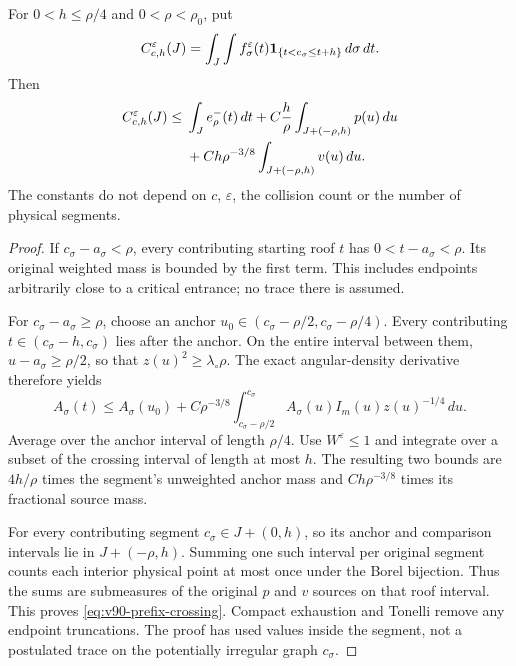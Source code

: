 \begin{lemma}
\label{lem:v90-prefix-crossing}
For $0<h\le\rho/4$ and $0<\rho<\rho_0$, put
\[
 C_{c,h}^\varepsilon(J)=\int_J\int
    f_\sigma^\varepsilon(t)\mathbf1_{\{t<c_\sigma\le t+h\}}\,d\sigma\,dt.
\]
Then
\begin{align}
 C_{c,h}^\varepsilon(J)\le{}&\int_J e_\rho^-(t)\,dt
       +C\frac h\rho\int_{J+(-\rho,h)}p(u)\,du\notag\\
       &+C h\rho^{-3/8}\int_{J+(-\rho,h)}v(u)\,du.
                                           \label{eq:v90-prefix-crossing}
\end{align}
The constants do not depend on $c$, $\varepsilon$, the collision
count or the number of physical segments.
\end{lemma}
\begin{proof}
If $c_\sigma-a_\sigma<\rho$, every contributing starting roof
$t$ has $0<t-a_\sigma<\rho$. Its original weighted mass is bounded
by the first term. This includes endpoints arbitrarily close to a
critical entrance; no trace there is assumed.

For $c_\sigma-a_\sigma\ge\rho$, choose an anchor
$u_0\in(c_\sigma-\rho/2,c_\sigma-\rho/4)$. Every contributing
$t\in(c_\sigma-h,c_\sigma)$ lies after the anchor. On the entire
interval between them, $u-a_\sigma\ge\rho/2$, so that
$z(u)^2\ge\lambda_\circ\rho$. The exact angular-density derivative
therefore yields
\[
 A_\sigma(t)\le A_\sigma(u_0)
    +C\rho^{-3/8}\int_{c_\sigma-\rho/2}^{c_\sigma}
                             A_\sigma(u)I_m(u)z(u)^{-1/4}\,du.
\]
Average over the anchor interval of length $\rho/4$. Use
$W^\varepsilon\le1$ and integrate over a subset of the crossing
interval of length at most $h$. The resulting two bounds are
$4h/\rho$ times the segment's unweighted anchor mass and
$Ch\rho^{-3/8}$ times its fractional source mass.

For every contributing segment $c_\sigma\in J+(0,h)$, so its
anchor and comparison intervals lie in $J+(-\rho,h)$. Summing one
such interval per original segment counts each interior physical point
at most once under the Borel bijection. Thus the sums are submeasures
of the original $p$ and $v$ sources on that roof interval. This proves
\eqref{eq:v90-prefix-crossing}. Compact exhaustion and Tonelli remove
any endpoint truncations. The proof has used values inside the segment,
not a postulated trace on the potentially irregular graph $c_\sigma$.
\end{proof}

